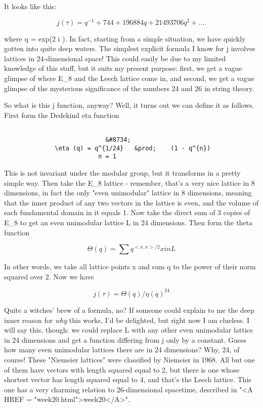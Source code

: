 It looks like this:


$$

           j(\tau ) = q^{-1} + 744 + 196884 q + 21493706 q^{2} + ....
$$
    

where q = exp(2 \pi  i \tau ).  In fact, starting from a simple situation,
we have quickly gotten into quite deep waters.  The simplest explicit
formula I know for j involves lattices in 24-dimensional space!  This
could easily be due to my limited knowledge of this stuff, but it suits
my present purpose: first, we get a vague glimpse of where E_8 and the
Leech lattice come in, and second, we get a vague glimpse of the
mysterious significance of the numbers 24 and 26 in string theory.

So what is this j function, anyway?  Well, it turns out we can define it
as follows.  First form the Dedekind eta function 


\begin{verbatim}

                            &#8734;
              \eta (q) = q^{1/24}   &prod;    (1 - q^{n})
                          n = 1
\end{verbatim}
    

This is not invariant under the modular group, but it transforms in a
pretty simple way.  Then take the E_{8} lattice - remember,
that's a very nice lattice in 8 dimensions, in fact the only "even
unimodular" lattice in 8 dimensions, meaning that the inner product of
any two vectors in the lattice is even, and the volume of each
fundamental domain in it equals 1.  Now take the direct sum of 3
copies of E_{8} to get an even unimodular lattice L in 24
dimensions.  Then form the theta function


$$

                    \Theta (q)   =   \sum   q^{<x,x>/2}
                             x in L
$$
    
In other words, we take all lattice points x and sum q to the power
of their norm squared over 2.  Now we have


$$

                      j(\tau ) = \Theta (q)/\eta (q)^{24}
$$
    
Quite a witches' brew of a formula, no?  If someone could explain to me
the deep inner reason for \emph{why} this works, I'd be delighted, but right
now I am clueless.  I will say this, though: we could replace L with any
other even unimodular lattice in 24 dimensions and get a function
differing from j only by a constant.  Guess how many even unimodular
lattices there are in 24 dimensions?  Why, 24, of course!  These 
"Niemeier lattices" were classified by Niemeier in 1968.  
All but one
of them have vectors with length squared equal to 2, but there is one whose
shortest vector has length squared equal to 4, and that's the Leech lattice.
This one has a very charming relation to 26-dimensional spacetime,
described in "<A HREF = "week20.html">week20</A>".  

